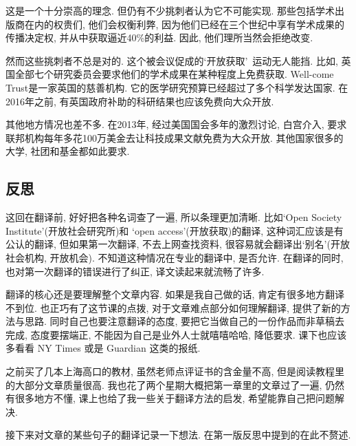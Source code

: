 \documentclass[a4paper, 12pt, UTF8]{article}
\begin{document}
这是一个十分崇高的理念. 但仍有不少挑刺者认为它不可能实现. 那些包括学术出版商在内的权贵们, 他们会权衡利弊, 因为他们已经在三个世纪中享有学术成果的传播决定权, 并从中获取逼近40\%的利益. 因此, 他们理所当然会拒绝改变.

然而这些挑刺者不总是对的. 这个被会议促成的\lq 开放获取\rq\ 运动无人能挡. 比如, 英国全部七个研究委员会要求他们的学术成果在某种程度上免费获取. Well-come Trust是一家英国的慈善机构. 它的医学研究预算已经超过了多个科学发达国家. 在2016年之前, 有英国政府补助的科研结果也应该免费向大众开放.

其他地方情况也差不多. 在2013年, 经过美国国会多年的激烈讨论, 白宫介入, 要求联邦机构每年多花100万美金去让科技成果文献免费为大众开放. 其他国家很多的大学, 社团和基金都如此要求.

\subsection{反思}
这回在翻译前, 好好把各种名词查了一遍, 所以条理更加清晰. 比如\lq Open Society Institute\rq (开放社会研究所)和 \lq open access\rq (开放获取)的翻译, 这种词汇应该是有公认的翻译, 但如果第一次翻译, 不去上网查找资料, 很容易就会翻译出\lq 别名\rq (开放社会机构, 开放机会). 不知道这种情况在专业的翻译中, 是否允许. 在翻译的同时, 也对第一次翻译的错误进行了纠正, 译文读起来就流畅了许多.

翻译的核心还是要理解整个文章内容. 如果是我自己做的话, 肯定有很多地方翻译不到位. 也正巧有了这节课的点拨, 对于文章难点部分如何理解翻译, 提供了新的方法与思路. 同时自己也要注意翻译的态度, 要把它当做自己的一份作品而非草稿去完成, 态度要摆端正, 不能因为自己是业外人士就嘻嘻哈哈, 降低要求. 课下也应该多看看 NY Times 或是 Guardian 这类的报纸.

之前买了几本上海高口的教材, 虽然老师点评证书的含金量不高, 但是阅读教程里的大部分文章质量很高. 我也花了两个星期大概把第一章里的文章过了一遍, 仍然有很多地方不懂, 课上也给了我一些关于翻译方法的启发, 希望能靠自己把问题解决.

接下来对文章的某些句子的翻译记录一下想法. 在第一版反思中提到的在此不赘述.
\end{document}

